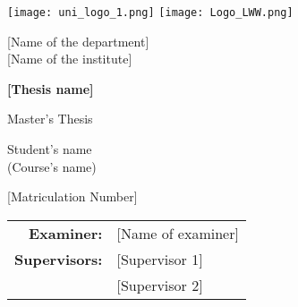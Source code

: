 \begin{titlepage}
	\begin{center}
	\texttt{[image: uni\_logo\_1.png]}\hspace*{6cm} %
	\texttt{[image: Logo\_LWW.png]}\\

		\vspace{3cm} %
		
		\large [Name of the department]\\
		
		\large [Name of the institute]\\
		
		\vspace{3cm} %

		\Huge\textbf{[Thesis name]}\\

		\vspace{1.5cm} %
		
		\Large Master's Thesis %
		
		\vspace{1.5cm} %
		
		\large Student's name\\
		\large (Course's name)
		
		\vspace{2cm} %
		
		\large [Matriculation Number] \\
		
		\Large \date{\today}
	\end{center}
		\vspace{1.5cm} %
		\begin{tabular}{rl}
			\textbf{Examiner:} & [Name of examiner] \\
			\textbf{Supervisors:} & [Supervisor 1] \\ & [Supervisor 2]
		\end{tabular}
	
\end{titlepage}
		